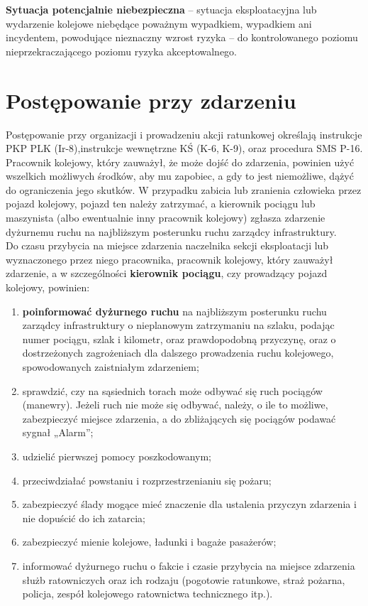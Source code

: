 \textbf{Sytuacja potencjalnie niebezpieczna} – sytuacja eksploatacyjna lub wydarzenie kolejowe niebędące poważnym wypadkiem, wypadkiem ani incydentem, powodujące nieznaczny wzrost ryzyka – do kontrolowanego poziomu nieprzekraczającego poziomu ryzyka akceptowalnego.

\section{Postępowanie przy zdarzeniu}
Postępowanie przy organizacji i prowadzeniu akcji ratunkowej określają instrukcje PKP PLK (Ir-8),instrukcje wewnętrzne KŚ (K-6, K-9), oraz procedura SMS P-16.
\\Pracownik kolejowy, który zauważył, że może dojść do zdarzenia, powinien użyć wszelkich możliwych środków, aby mu zapobiec, a gdy to jest niemożliwe, dążyć do ograniczenia jego skutków. 
W przypadku zabicia lub zranienia człowieka przez pojazd kolejowy, pojazd ten należy zatrzymać, a kierownik pociągu lub maszynista (albo ewentualnie inny pracownik kolejowy) zgłasza zdarzenie dyżurnemu ruchu na najbliższym posterunku ruchu zarządcy infrastruktury.
\\Do czasu przybycia na miejsce zdarzenia naczelnika sekcji eksploatacji lub wyznaczonego przez niego pracownika, pracownik kolejowy, który zauważył zdarzenie, a w szczególności \textbf{kierownik pociągu}, czy prowadzący pojazd kolejowy, powinien:
\begin{enumerate}
	\item \textbf{poinformować dyżurnego ruchu} na najbliższym posterunku ruchu zarządcy infrastruktury o nieplanowym zatrzymaniu na szlaku, podając numer pociągu, szlak i kilometr, oraz prawdopodobną przyczynę, oraz o dostrzeżonych zagrożeniach dla dalszego prowadzenia ruchu kolejowego, spowodowanych zaistniałym zdarzeniem;
	\item sprawdzić, czy na sąsiednich torach może odbywać się ruch pociągów (manewry).
	Jeżeli ruch nie może się odbywać, należy, o ile to możliwe, zabezpieczyć miejsce zdarzenia, a do zbliżających się pociągów podawać sygnał „Alarm”;
	\item udzielić pierwszej pomocy poszkodowanym;
	\item przeciwdziałać powstaniu i rozprzestrzenianiu się pożaru;
	\item zabezpieczyć ślady mogące mieć znaczenie dla ustalenia przyczyn zdarzenia i nie dopuścić do ich zatarcia;
	\item zabezpieczyć mienie kolejowe, ładunki i bagaże pasażerów;
	\item informować dyżurnego ruchu o fakcie i czasie przybycia na miejsce zdarzenia służb	ratowniczych oraz ich rodzaju (pogotowie ratunkowe, straż pożarna, policja, zespół kolejowego ratownictwa technicznego itp.).
\end{enumerate}

